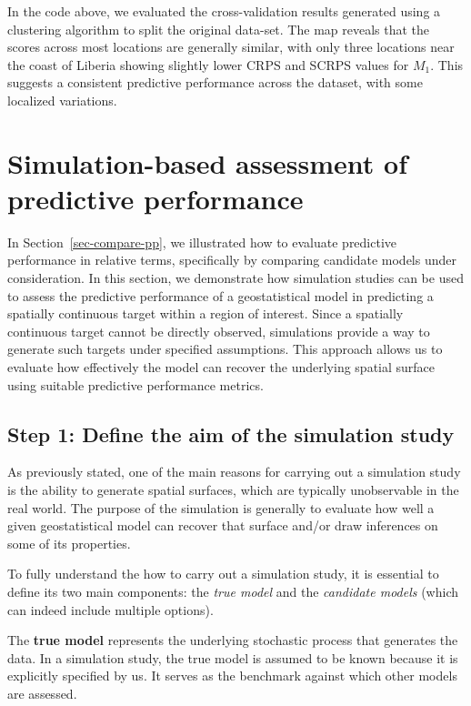 \documentclass[
  letterpaper,
]{krantz}
\begin{document}
In the code above, we evaluated the cross-validation results generated
using a clustering algorithm to split the original data-set. The map
reveals that the scores across most locations are generally similar,
with only three locations near the coast of Liberia showing slightly
lower CRPS and SCRPS values for \(M_1\). This suggests a consistent
predictive performance across the dataset, with some localized
variations.

\section{Simulation-based assessment of predictive
performance}\label{simulation-based-assessment-of-predictive-performance}

In Section~\ref{sec-compare-pp}, we illustrated how to evaluate
predictive performance in relative terms, specifically by comparing
candidate models under consideration. In this section, we demonstrate
how simulation studies can be used to assess the predictive performance
of a geostatistical model in predicting a spatially continuous target
within a region of interest. Since a spatially continuous target cannot
be directly observed, simulations provide a way to generate such targets
under specified assumptions. This approach allows us to evaluate how
effectively the model can recover the underlying spatial surface using
suitable predictive performance metrics.

\subsection{Step 1: Define the aim of the simulation
study}\label{sec-sim-step1}

As previously stated, one of the main reasons for carrying out a
simulation study is the ability to generate spatial surfaces, which are
typically unobservable in the real world. The purpose of the simulation
is generally to evaluate how well a given geostatistical model can
recover that surface and/or draw inferences on some of its properties.

To fully understand the how to carry out a simulation study, it is
essential to define its two main components: the \emph{true model} and
the \emph{candidate models} (which can indeed include multiple options).

The \textbf{true model} represents the underlying stochastic process
that generates the data. In a simulation study, the true model is
assumed to be known because it is explicitly specified by us. It serves
as the benchmark against which other models are assessed.
\end{document}
